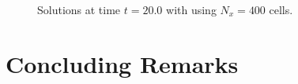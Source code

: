 \documentclass[10pt,a4paper]{article}
\begin{document}
\begin{figure}
\begin{minipage}[b][4.5cm]{\textwidth}
    \end{minipage}
    \caption{
    Solutions at time $t=20.0$ with using $N_x=400$ cells.
    }
	\label{fig:nx400t2}
\end{figure}

\section{Concluding Remarks}
\label{sec:Conclusions}


 
\end{document}
